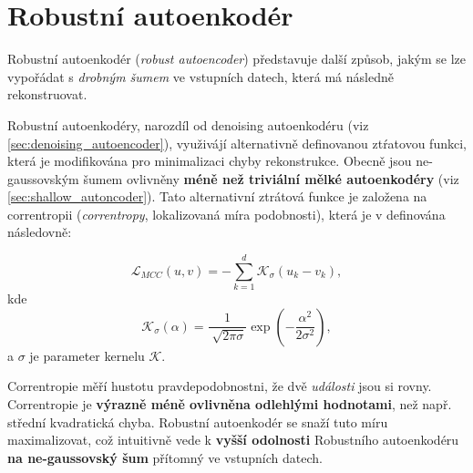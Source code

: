 \section{Robustní autoenkodér}
Robustní autoenkodér (\emph{robust autoencoder}) představuje další způsob, jakým se lze vypořádat s \emph{drobným šumem} ve vstupních datech, která má následně rekonstruovat.


Robustní autoenkodéry, narozdíl od denoising autoenkodéru (viz \autoref{sec:denoising_autoencoder}), využivájí alternativně definovanou ztŕatovou funkci, která je modifikována pro minimalizaci chyby rekonstrukce.
Obecně jsou ne-gaussovským šumem ovlivněny \textbf{méně než triviální mělké autoenkodéry} (viz \autoref{sec:shallow_autoncoder}).
Tato alternativní ztrátová funkce je založena na correntropii (\emph{correntropy}, lokalizovaná míra podobnosti), která je v \cite{Liu2006} definována následovně:

\begin{equation}
    \mathcal{L}_{MCC}(u, v) = -\sum_{k=1}^{d} \mathcal{K}_\sigma(u_k - v_k),
\end{equation}
kde
\begin{equation}
    \mathcal{K}_\sigma(\alpha) = \frac{1}{\sqrt[]{2\pi\sigma}}\exp(-\frac{\alpha^2}{2\sigma^2}),
\end{equation}
a $\sigma$ je parameter kernelu $\mathcal{K}$.

Correntropie měří hustotu pravdepodobnostni, že dvě \emph{události} jsou si rovny.
Correntropie je \textbf{výrazně méně ovlivněna odlehlými hodnotami}, než např. střední kvadratická chyba. \cite{Liu2006}
Robustní autoenkodér se snaží tuto míru maximalizovat, což intuitivně vede k \textbf{vyšší odolnosti} Robustního autoenkodéru \textbf{na ne-gaussovský šum} přítomný ve vstupních datech. \cite{Charte2018}
